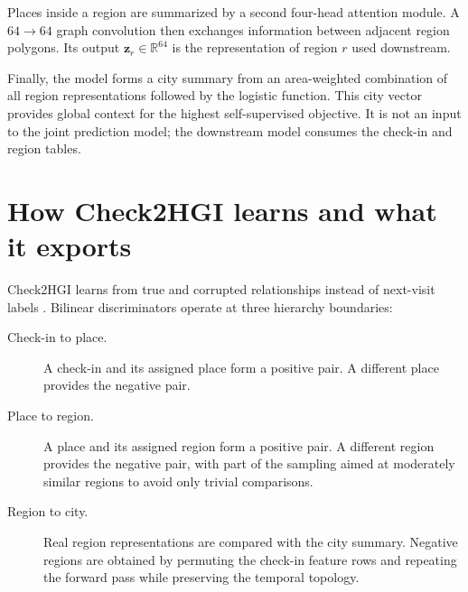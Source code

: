 Places inside a region are summarized by a second four-head attention module. A
$64\rightarrow64$ graph convolution then exchanges information between adjacent
region polygons. Its output $\mathbf{z}_r\in\mathbb{R}^{64}$ is the representation
of region $r$ used downstream.

Finally, the model forms a city summary from an area-weighted combination of all
region representations followed by the logistic function. This city vector provides global
context for the highest self-supervised objective. It is not an input to the joint
prediction model; the downstream model consumes the check-in and region tables.

\section{How Check2HGI learns and what it exports}
\label{sec:apx-check2hgi-learning}

Check2HGI learns from true and corrupted relationships instead of next-visit labels
\cite{velickovic2019deep,huang2023hgi}. Bilinear discriminators operate at three
hierarchy boundaries:

\begin{description}
    \item[Check-in to place.] A check-in and its assigned place form a positive
    pair. A different place provides the negative pair.

    \item[Place to region.] A place and its assigned region form a positive pair.
    A different region provides the negative pair, with part of the sampling aimed
    at moderately similar regions to avoid only trivial comparisons.

    \item[Region to city.] Real region representations are compared with the city
    summary. Negative regions are obtained by permuting the check-in feature rows
    and repeating the forward pass while preserving the temporal topology.
\end{description}

